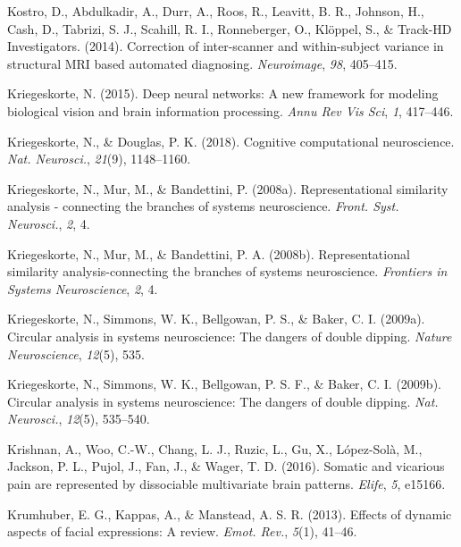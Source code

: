 \documentclass[11pt,american,]{memoir} %
\begin{document}
\leavevmode\hypertarget{ref-Kostro2014-cm}{}%
Kostro, D., Abdulkadir, A., Durr, A., Roos, R., Leavitt, B. R., Johnson, H., Cash, D., Tabrizi, S. J., Scahill, R. I., Ronneberger, O., Klöppel, S., \& Track-HD Investigators. (2014). Correction of inter-scanner and within-subject variance in structural MRI based automated diagnosing. \emph{Neuroimage}, \emph{98}, 405--415.

\leavevmode\hypertarget{ref-Kriegeskorte2015-qi}{}%
Kriegeskorte, N. (2015). Deep neural networks: A new framework for modeling biological vision and brain information processing. \emph{Annu Rev Vis Sci}, \emph{1}, 417--446.

\leavevmode\hypertarget{ref-Kriegeskorte2018-om}{}%
Kriegeskorte, N., \& Douglas, P. K. (2018). Cognitive computational neuroscience. \emph{Nat. Neurosci.}, \emph{21}(9), 1148--1160.

\leavevmode\hypertarget{ref-Kriegeskorte2008-kv}{}%
Kriegeskorte, N., Mur, M., \& Bandettini, P. (2008a). Representational similarity analysis - connecting the branches of systems neuroscience. \emph{Front. Syst. Neurosci.}, \emph{2}, 4.

\leavevmode\hypertarget{ref-kriegeskorte2008representational}{}%
Kriegeskorte, N., Mur, M., \& Bandettini, P. A. (2008b). Representational similarity analysis-connecting the branches of systems neuroscience. \emph{Frontiers in Systems Neuroscience}, \emph{2}, 4.

\leavevmode\hypertarget{ref-kriegeskorte2009circular}{}%
Kriegeskorte, N., Simmons, W. K., Bellgowan, P. S., \& Baker, C. I. (2009a). Circular analysis in systems neuroscience: The dangers of double dipping. \emph{Nature Neuroscience}, \emph{12}(5), 535.

\leavevmode\hypertarget{ref-Kriegeskorte2009-yz}{}%
Kriegeskorte, N., Simmons, W. K., Bellgowan, P. S. F., \& Baker, C. I. (2009b). Circular analysis in systems neuroscience: The dangers of double dipping. \emph{Nat. Neurosci.}, \emph{12}(5), 535--540.

\leavevmode\hypertarget{ref-krishnan2016somatic}{}%
Krishnan, A., Woo, C.-W., Chang, L. J., Ruzic, L., Gu, X., López-Solà, M., Jackson, P. L., Pujol, J., Fan, J., \& Wager, T. D. (2016). Somatic and vicarious pain are represented by dissociable multivariate brain patterns. \emph{Elife}, \emph{5}, e15166.

\leavevmode\hypertarget{ref-Krumhuber2013-qi}{}%
Krumhuber, E. G., Kappas, A., \& Manstead, A. S. R. (2013). Effects of dynamic aspects of facial expressions: A review. \emph{Emot. Rev.}, \emph{5}(1), 41--46.
\end{document}
